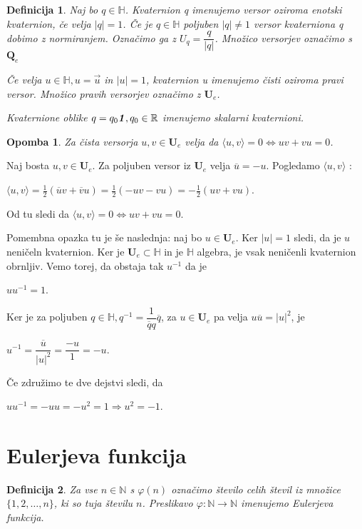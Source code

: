 \documentclass[a4paper,12pt]{article}
\def\N{\mathbb{N}} %
\def\R{\mathbb{R}} %
\def\H{\mathbb{H}} %
\def\Qe{\textbf{Q}_{e}} %
\def\Ue{\textbf{U}_{e}} %
\def\1{\textbf{\emph{1}}}
\newcommand{\dotpr}[2]{\langle #1, #2 \rangle}
\newtheorem{opomba}{Opomba}
\newtheorem{definicija}{Definicija}
\begin{document}
\begin{definicija}
   Naj bo $q \in \H$. Kvaternion q imenujemo \emph{versor} oziroma \emph{enotski kvaternion}, če velja
   $|q| = 1$. Če je $q \in \H$ poljuben $|q| \neq 1$ versor kvaterniona q dobimo z normiranjem. Označimo ga z $U_{q} = \dfrac{q}{|q|}$. 
   Množico versorjev označimo s $\Qe$

   Če velja $u \in \H, u = \vec{u}$ in $|u| = 1$, kvaternion u imenujemo \emph{čisti} oziroma \emph{pravi} versor.
   Množico pravih versorjev označimo z $\Ue$.

   Kvaternione oblike $q = q_{0}\1, q_{0} \in \R$ imenujemo \emph{skalarni kvaternioni.}
\end{definicija}
\begin{opomba}
   Za čista versorja $u, v \in \Ue$ velja da $\dotpr{u}{v} = 0 \iff uv + vu = 0$.
\end{opomba}
Naj bosta $u, v \in \Ue$. Za poljuben versor iz $\Ue$ velja $\overline{u} = -u$. Pogledamo $\dotpr{u}{v}$ :
\begin{center}
   $\dotpr{u}{v} = \frac{1}{2}(\overline{u}v + \overline{v}u) = \frac{1}{2}(-uv -vu) = -\frac{1}{2}(uv + vu)$.
\end{center}
Od tu sledi da $\dotpr{u}{v} = 0 \iff uv + vu = 0$.

Pomembna opazka tu je še naslednja: naj bo $u \in \Ue$. Ker $|u| = 1$ sledi, da je $u$ neničeln kvaternion.
Ker je $\Ue \subset \H$ in je $\H$ algebra, je vsak neničenli kvaternion obrnljiv. Vemo torej, da obstaja tak $u^{-1}$ da je
\begin{center}
   $uu^{-1} = 1$.
\end{center}
Ker je za poljuben $q \in \H, q^{-1} = \dfrac{1}{\overline{q}q} \overline{q}$, za $u \in \Ue$ pa velja $u\overline{u} = |u|^2$, je 
\begin{center}
   $u^{-1} = \dfrac{\overline{u}}{|u|^2} = \dfrac{-u}{1} = -u$.
\end{center}
Če združimo te dve dejstvi sledi, da
\begin{center}
   $uu^{-1} = -uu = -u^2 = 1 \Rightarrow u^2 = -1$.
\end{center}
\section{Eulerjeva funkcija}


\begin{definicija}
Za vse $n \in \N$ s $\varphi(n)$ označimo število 
celih števil iz množice $\{1, 2, \ldots, n\}$, ki so tuja številu $n$.
Preslikavo $\varphi: \N \to \N$ imenujemo \em{Eulerjeva funkcija}.
\end{definicija}
\end{document}
